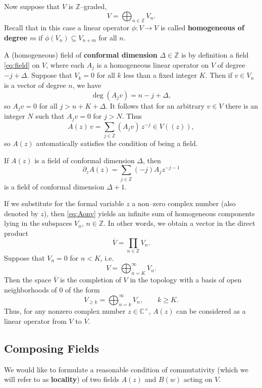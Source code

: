 \documentclass[12pt]{article}
\begin{document}
Now suppose that $V$ is $\mathbb{Z}$–graded,
\[
    V = \bigoplus_{n \in \mathbb{Z}} V_n.
\]
Recall that in this case a linear operator $\phi : V \to V$ is called \textbf{homogeneous of degree $m$} if $\phi(V_n) \subseteq V_{n+m}$ for all $n$.

A (homogeneous) field of \textbf{conformal dimension} $\Delta \in \mathbb{Z}$ is by definition a field \eqref{eq:field} on $V$, where each $A_j$ is a homogeneous linear operator on $V$ of degree $-j + \Delta$.
Suppose that $V_k = 0$ for all $k$ less than a fixed integer $K$.
Then if $v \in V_n$ is a vector of degree $n$, we have
\[
    \deg(A_j v) = n - j + \Delta,
\]
so $A_j v = 0$ for all $j > n + K + \Delta$.
It follows that for an arbitrary $v \in V$ there is an integer $N$ such that $A_j v = 0$ for $j > N$. Thus
\begin{equation}\label{eq:Aonv}
    A(z)\,v = \sum_{j \in \mathbb{Z}} (A_j v)\, z^{-j} \in V((z)),
\end{equation}
so $A(z)$ automatically satisfies the condition of being a field.

\medskip

If $A(z)$ is a field of conformal dimension $\Delta$, then
\[
    \partial_z A(z) = \sum_{j \in \mathbb{Z}} (-j) A_j z^{-j-1}
\]
is a field of conformal dimension $\Delta + 1$.

\medskip

If we substitute for the formal variable $z$ a non–zero complex number (also denoted by $z$), then \eqref{eq:Aonv} yields an infinite sum of homogeneous components lying in the subspaces $V_n$, $n \in \mathbb{Z}$.
In other words, we obtain a vector in the direct product
\[
    \overline{V} = \prod_{n \in \mathbb{Z}} V_n.
\]
Suppose that $V_n = 0$ for $n < K$, i.e.
\[
    V = \bigoplus_{n=K}^{\infty} V_n.
\]
Then the space $\overline{V}$ is the completion of $V$ in the topology with a basis of open neighborhoods of $0$ of the form
\[
    V_{\ge k} = \bigoplus_{n=k}^{\infty} V_n, \qquad k \ge K.
\]
Thus, for any nonzero complex number $z \in \mathbb{C}^\times$, $A(z)$ can be considered as a linear operator from $V$ to $\overline{V}$.
\subsection{Composing Fields}

We would like to formulate a reasonable condition of commutativity (which we will refer to as \textbf{locality}) of two fields $A(z)$ and $B(w)$ acting on $V$.
\end{document}
